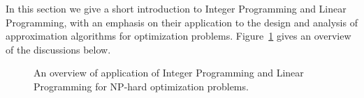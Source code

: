 \documentclass[oneside,final]{ucr}
\def\dsp{\def\baselinestretch{2.0}\large\normalsize}
\def\ssp{\def\baselinestretch{1.0}\large\normalsize}
\begin{document}
In this section we give a short introduction to Integer
Programming and Linear Programming, with an emphasis on
their application to the design and analysis of
approximation algorithms for optimization
problems. Figure~\ref{fig:npo_ilp} gives an overview of the
discussions below.
\ssp
\begin{figure}[ht]
  \centering
  \caption{An overview of application of Integer Programming and Linear Programming for NP-hard optimization problems.}
  \label{fig:npo_ilp}
\end{figure}
\dsp
\end{document}
